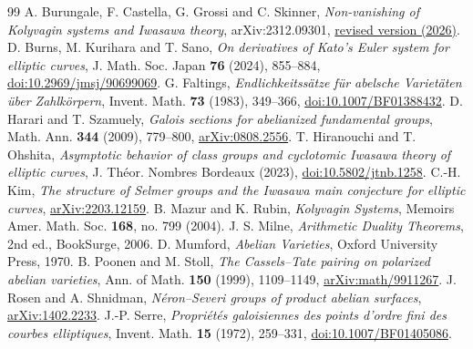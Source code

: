 \documentclass[11pt,a4paper]{article}
\theoremstyle{definition}\newtheorem{definition}[theorem]{Definition}
\theoremstyle{remark}\newtheorem{remark}[theorem]{Remark}
\numberwithin{equation}{section}
\begin{document}
\clearpage
\begin{thebibliography}{99}\small
{} A. Burungale, F. Castella, G. Grossi and C. Skinner, \emph{Non-vanishing of Kolyvagin systems and Iwasawa theory}, arXiv:2312.09301, \href{https://arxiv.org/abs/2312.09301}{revised version (2026)}.
 D. Burns, M. Kurihara and T. Sano, \emph{On derivatives of Kato's Euler system for elliptic curves}, J. Math. Soc. Japan \textbf{76} (2024), 855--884, \href{https://doi.org/10.2969/jmsj/90699069}{doi:10.2969/jmsj/90699069}.
 G. Faltings, \emph{Endlichkeitss\"atze f\"ur abelsche Variet\"aten \"uber Zahlk\"orpern}, Invent. Math. \textbf{73} (1983), 349--366, \href{https://doi.org/10.1007/BF01388432}{doi:10.1007/BF01388432}.
 D. Harari and T. Szamuely, \emph{Galois sections for abelianized fundamental groups}, Math. Ann. \textbf{344} (2009), 779--800, \href{https://arxiv.org/abs/0808.2556}{arXiv:0808.2556}.
 T. Hiranouchi and T. Ohshita, \emph{Asymptotic behavior of class groups and cyclotomic Iwasawa theory of elliptic curves}, J. Th\'eor. Nombres Bordeaux (2023), \href{https://doi.org/10.5802/jtnb.1258}{doi:10.5802/jtnb.1258}.
 C.-H. Kim, \emph{The structure of Selmer groups and the Iwasawa main conjecture for elliptic curves}, \href{https://arxiv.org/abs/2203.12159}{arXiv:2203.12159}.
 B. Mazur and K. Rubin, \emph{Kolyvagin Systems}, Memoirs Amer. Math. Soc. \textbf{168}, no. 799 (2004).
 J. S. Milne, \emph{Arithmetic Duality Theorems}, 2nd ed., BookSurge, 2006.
 D. Mumford, \emph{Abelian Varieties}, Oxford University Press, 1970.
 B. Poonen and M. Stoll, \emph{The Cassels--Tate pairing on polarized abelian varieties}, Ann. of Math. \textbf{150} (1999), 1109--1149, \href{https://arxiv.org/abs/math/9911267}{arXiv:math/9911267}.
 J. Rosen and A. Shnidman, \emph{N\'{e}ron--Severi groups of product abelian surfaces}, \href{https://arxiv.org/abs/1402.2233}{arXiv:1402.2233}.
 J.-P. Serre, \emph{Propri\'et\'es galoisiennes des points d'ordre fini des courbes elliptiques}, Invent. Math. \textbf{15} (1972), 259--331, \href{https://doi.org/10.1007/BF01405086}{doi:10.1007/BF01405086}.
\end{thebibliography}
\end{document}
